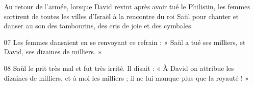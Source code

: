Au retour de l’armée, lorsque David revint après avoir tué le Philistin, les femmes sortirent de toutes les villes d’Israël à la rencontre du roi Saül pour chanter et danser au son des tambourins, des cris de joie et des cymbales.

07 Les femmes dansaient en se renvoyant ce refrain : « Saül a tué ses milliers, et David, ses dizaines de milliers. »

08 Saül le prit très mal et fut très irrité. Il disait : « À David on attribue les dizaines de milliers, et à moi les milliers ; il ne lui manque plus que la royauté ! »
